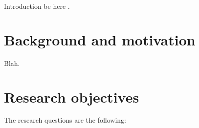 
Introduction be here \cite{cheswick}.

\section{Background and motivation}

Blah.

\section{Research objectives}
\label{sect:questions}

The research questions are the following:


